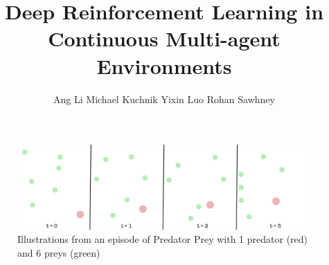 \documentclass{article}
\title{Deep Reinforcement Learning in Continuous Multi-agent Environments}
\author{
Ang Li \And%
Michael Kuchnik \And%
Yixin Luo \And%
Rohan Sawhney
}
\begin{document}

\maketitle

% 

\begin{figure}[h]
    \centering
    \includegraphics[width=\textwidth]{cover}
	\caption{Illustrations from an episode of Predator Prey with 1 predator (red) and 6 preys (green)}\label{Figure 1}
\end{figure}








\end{document}
